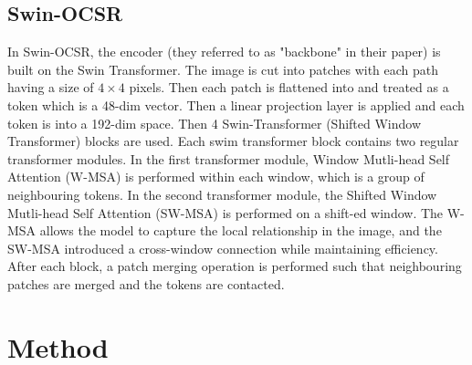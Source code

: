 \documentclass[conference]{IEEEtran}
\begin{document}
\subsection{Swin-OCSR}
In Swin-OCSR, the encoder (they referred to as "backbone" in their paper) is built on the Swin Transformer. The image is cut into patches with each path having a size of $4 \times 4$ pixels. Then each patch is flattened into and treated as a token which is a 48-dim vector. Then a linear projection layer is applied and each token is into a 192-dim space. 
Then 4 Swin-Transformer (Shifted Window Transformer) \cite{swin_tran} blocks are used. Each swim transformer block contains two regular transformer modules. In the first transformer module, Window Mutli-head Self Attention (W-MSA) is performed within each window, which is a group of neighbouring tokens. In the second transformer module, the Shifted Window Mutli-head Self Attention (SW-MSA) is performed on a shift-ed window. The W-MSA allows the model to capture the local relationship in the image, and the SW-MSA introduced a cross-window connection while maintaining efficiency. After each block, a patch merging operation is performed such that neighbouring patches are merged and the tokens are contacted. \cite{swin_tran} \cite{swinocsr}




\section{Method}
\end{document}
